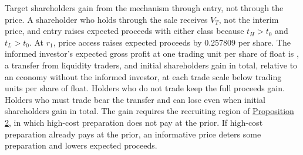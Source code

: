 
Target shareholders gain from the mechanism through entry, not
through the price. A shareholder who holds through the sale receives
\(V_T\), not the interim price, and entry raises expected proceeds
with either class because \(t_H>t_0\) and \(t_L>t_0\). At \(r_1\),
price access raises expected proceeds by 0.257809 per share. The
informed investor's expected gross profit at one trading unit per
share of float is , a transfer from liquidity traders,
and initial shareholders gain in total, relative to an economy
without the informed investor, at each trade scale below
 trading units per share of float. Holders who
do not trade keep the full proceeds gain. Holders who must trade
bear the transfer and can lose even when initial shareholders gain
in total. The gain requires the recruiting region of
\hyperref[result-proposition-2]{Proposition 2}, in which high-cost
preparation does not pay at the prior. If high-cost preparation
already pays at the prior, an informative price deters some
preparation and lowers expected proceeds.
